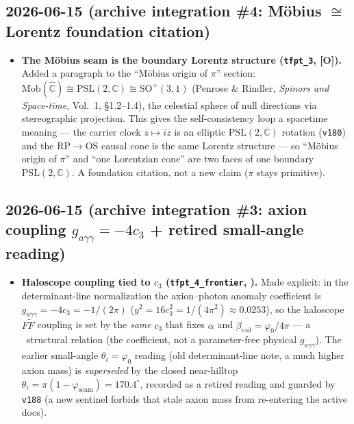 \documentclass[11pt]{article}
\providecommand{\mO}{\textbf{[O]}}\providecommand{\mX}{\textbf{[X]}}
\providecommand{\vref}[1]{\texttt{#1}}
\begin{document}
\subsection*{2026-06-15 (archive integration \#4: M\"obius $\cong$ Lorentz foundation citation)}
\begin{itemize}
\item \textbf{The M\"obius seam is the boundary Lorentz structure (\texttt{tfpt\_3}, \mO).} Added a paragraph
  to the ``M\"obius origin of $\pi$'' section: $\mathrm{M\ddot{o}b}(\hat{\mathbb C})\cong\mathrm{PSL}(2,\mathbb C)
  \cong\mathrm{SO}^+(3,1)$ (Penrose \& Rindler, \emph{Spinors and Space-time}, Vol.~1, \S1.2--1.4), the
  celestial sphere of null directions via stereographic projection. This gives the self-consistency loop a
  spacetime meaning --- the carrier clock $z\mapsto iz$ is an elliptic $\mathrm{PSL}(2,\mathbb C)$ rotation
  (\vref{v180}) and the RP$\to$OS causal cone is the same Lorentz structure --- so ``M\"obius origin of $\pi$''
  and ``one Lorentzian cone'' are two faces of one boundary $\mathrm{PSL}(2,\mathbb C)$. A foundation citation,
  not a new claim ($\pi$ stays primitive).
\end{itemize}

\subsection*{2026-06-15 (archive integration \#3: axion coupling $g_{a\gamma\gamma}=-4c_3$ + retired small-angle reading)}
\begin{itemize}
\item \textbf{Haloscope coupling tied to $c_3$ (\texttt{tfpt\_4\_frontier}, \mC).} Made explicit: in the
  determinant-line normalization the axion--photon anomaly coefficient is $g_{a\gamma\gamma}=-4c_3=-1/(2\pi)$
  ($y^2=16c_3^2=1/(4\pi^2)\approx0.0253$), so the haloscope $F\tilde F$ coupling is set by the \emph{same}
  $c_3$ that fixes $\alpha$ and $\beta_{\mathrm{rad}}=\varphi_0/4\pi$ --- a \mC\ structural relation (the
  coefficient, not a parameter-free physical $g_{a\gamma\gamma}$). The earlier small-angle
  $\theta_i=\varphi_0$ reading (old determinant-line note, a much higher axion mass) is \emph{superseded} by
  the closed near-hilltop $\theta_i=\pi(1-\varphi_{\mathrm{seam}})=170.4^\circ$, recorded as a retired reading
  and guarded by \vref{v188} (a new sentinel forbids that stale axion mass from re-entering the active docs).
\end{itemize}
\end{document}
